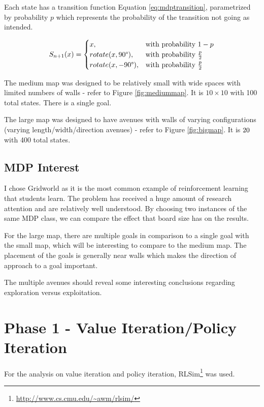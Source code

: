 \documentclass[11pt]{article}
\begin{document}
Each state has a transition function Equation \ref{eq:mdptransition}, parametrized by probability $p$ which represents the probability of the transition not going as intended.

\begin{equation}
\label{eq:mdptransition}
S_{n+1}(x) = 
\begin{cases}
    x,& \text{with probability } 1-p\\
    rotate(x, 90\degree),              & \text{with probability } \frac{p}{2}\\
    rotate(x, -90\degree),              & \text{with probability } \frac{p}{2}
\end{cases}
\end{equation}

The medium map was designed to be relatively small with wide spaces with limited numbers of walls - refer to Figure \ref{fig:mediummap}. It is $10 \times 10$ with 100 total states. There is a single goal.

The large map was designed to have avenues with walls of varying configurations (varying length/width/direction avenues) - refer to Figure \ref{fig:bigmap}. It is $20 \time 20$ with 400 total states.

\subsection{MDP Interest}
I chose Gridworld as it is the most common example of reinforcement learning that students learn. The problem has received a huge amount of research attention and are relatively well understood. By choosing two instances of the same MDP class, we can compare the effect that board size has on the results.

For the large map, there are multiple goals in comparison to a single goal with the small map, which will be interesting to compare to the medium map. The placement of the goals is generally near walls which makes the direction of approach to a goal important.

The multiple avenues should reveal some interesting conclusions regarding exploration versus exploitation.



\section{Phase 1 - Value Iteration/Policy Iteration}

For the analysis on value iteration and policy iteration, RLSim\footnote{\url{http://www.cs.cmu.edu/~awm/rlsim/}} was used.
\end{document}
